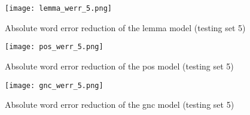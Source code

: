 \begin{figure}[!htbp]
	  \centering
	  \texttt{[image: lemma\_werr\_5.png]}
	      \caption{Absolute word error reduction of the lemma model (testing set 5)}
	      \label{figure:lemmy5}
\end{figure}

\begin{figure}[!htbp]
	  \centering
	  \texttt{[image: pos\_werr\_5.png]}
	      \caption{Absolute word error reduction of the pos model (testing set 5)}
	      \label{figure:pos5}
\end{figure}

\begin{figure}[!htbp]
	  \centering
	  \texttt{[image: gnc\_werr\_5.png]}
	      \caption{Absolute word error reduction of the gnc model (testing set 5)}
	      \label{figure:gnc5}
\end{figure}
